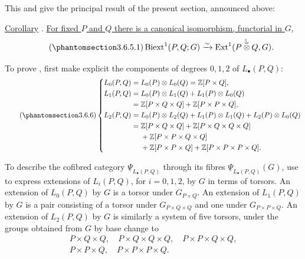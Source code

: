 This and  give the principal result of the present section,
announced above:

\underline{Corollary} . \underline{For fixed $P$ and $Q$ there
is a canonical isomorphism, functorial in $G$,}
\begin{equation}\tag{\SGARefTarget{sga7.sga7i.evii.n3-6-5-1}{3.6.5.1}}
 \Biext^1(P,Q;G)
 \xrightarrow{\sim}
 \Ext^1(P\mathbin{\overset{\mathbb L}{\otimes}}Q,G).
\end{equation}

To prove , first make explicit the components of degrees
$0,1,2$ of $L_\bullet(P,Q)$:
\begin{equation}\tag{\SGARefTarget{sga7.sga7i.evii.n3-6-6}{3.6.6}}
\left\{
\begin{aligned}
 L_0(P,Q)
  ={}&L_0(P)\otimes L_0(Q)
     =\mathbb Z[P\times Q],\\
 L_1(P,Q)
  ={}&L_0(P)\otimes L_1(Q)+L_1(P)\otimes L_0(Q)\\
  ={}&\mathbb Z[P\times Q\times Q]
     +\mathbb Z[P\times P\times Q],\\
 L_2(P,Q)
  ={}&L_0(P)\otimes L_2(Q)+L_1(P)\otimes L_1(Q)
     +L_2(P)\otimes L_0(Q)\\
  ={}&\mathbb Z[P\times Q\times Q]
     +\mathbb Z[P\times Q\times Q\times Q]\\
   &+\mathbb Z[P\times P\times Q\times Q]\\
   &+\mathbb Z[P\times P\times Q]
     +\mathbb Z[P\times P\times P\times Q].
\end{aligned}
\right.
\end{equation}

To describe the cofibred category
$\underline\Psi_{L_\bullet(P,Q)}$ through its fibres
$\underline\Psi_{L_\bullet(P,Q)}(G)$, use  to express extensions
of $L_i(P,Q)$, for $i=0,1,2$, by $G$ in terms of torsors.  An
extension of $L_0(P,Q)$ by $G$ is a torsor under $G_{P\times Q}$.
An extension of $L_1(P,Q)$ by $G$ is a pair consisting of a torsor
under $G_{P\times Q\times Q}$ and one under
$G_{P\times P\times Q}$.  An extension of $L_2(P,Q)$ by $G$ is
similarly a system of five torsors, under the groups obtained from
$G$ by base change to
\[
\begin{gathered}
 P\times Q\times Q,\quad
 P\times Q\times Q\times Q,\quad
 P\times P\times Q\times Q,\\
 P\times P\times Q,\quad
 P\times P\times P\times Q.
\end{gathered}
\]

